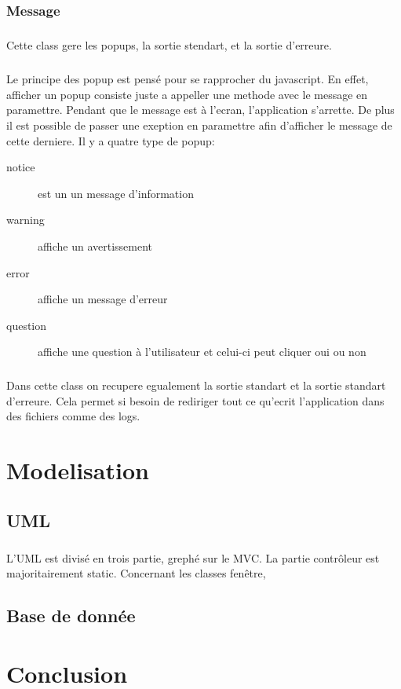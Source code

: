 \documentclass[a4paper,10pt]{report}
\begin{document}
		\subsection{Message}

			\paragraph*{}
			Cette class gere les popups, la sortie stendart, et la sortie d'erreure.

			\paragraph*{}
			Le principe des popup est pensé pour se rapprocher du javascript. En effet, afficher un popup consiste juste a appeller une methode avec le message en paramettre. Pendant que le message est à l'ecran, l'application s'arrette. De plus il est possible de passer une exeption en paramettre afin d'afficher le message de cette derniere.
			Il y a quatre type de popup:
			\begin{description}
				\item[notice] est un un message d'information
				\item[warning] affiche un avertissement
				\item[error] affiche un message d'erreur
				\item[question] affiche une question à l'utilisateur et celui-ci peut cliquer oui ou non 
			\end{description}

			\paragraph*{}
			Dans cette class on recupere egualement la sortie standart  et la sortie standart d'erreure. Cela permet si besoin de rediriger tout ce qu'ecrit l'application dans des fichiers comme des logs.

\chapter{Modelisation}

	\section{UML}

		\paragraph*{}
		L'UML est divisé en trois partie, grephé sur le MVC. La partie contrôleur est majoritairement static. Concernant les classes fenêtre, 

	\section{Base de donnée}

\chapter*{Conclusion}
\end{document}
